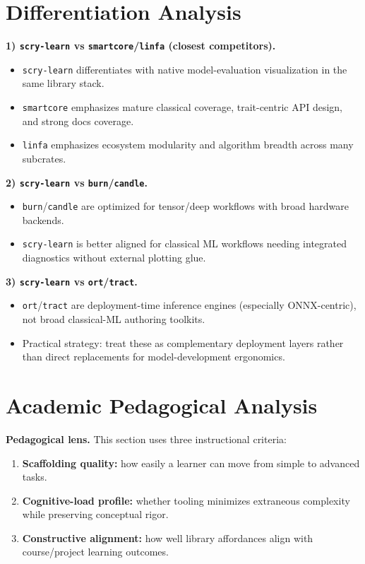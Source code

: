 \documentclass[11pt]{article}
\begin{document}
\section{Differentiation Analysis}
\textbf{1) \texttt{scry-learn} vs \texttt{smartcore}/\texttt{linfa} (closest competitors).}
\begin{itemize}[leftmargin=1.4em]
\item \texttt{scry-learn} differentiates with native model-evaluation visualization in the same library stack.
\item \texttt{smartcore} emphasizes mature classical coverage, trait-centric API design, and strong docs coverage.
\item \texttt{linfa} emphasizes ecosystem modularity and algorithm breadth across many subcrates.
\end{itemize}

\textbf{2) \texttt{scry-learn} vs \texttt{burn}/\texttt{candle}.}
\begin{itemize}[leftmargin=1.4em]
\item \texttt{burn}/\texttt{candle} are optimized for tensor/deep workflows with broad hardware backends.
\item \texttt{scry-learn} is better aligned for classical ML workflows needing integrated diagnostics without external plotting glue.
\end{itemize}

\textbf{3) \texttt{scry-learn} vs \texttt{ort}/\texttt{tract}.}
\begin{itemize}[leftmargin=1.4em]
\item \texttt{ort}/\texttt{tract} are deployment-time inference engines (especially ONNX-centric), not broad classical-ML authoring toolkits.
\item Practical strategy: treat these as complementary deployment layers rather than direct replacements for model-development ergonomics.
\end{itemize}

\section{Academic Pedagogical Analysis}
\textbf{Pedagogical lens.} This section uses three instructional criteria:
\begin{enumerate}[leftmargin=1.4em]
\item \textbf{Scaffolding quality:} how easily a learner can move from simple to advanced tasks.
\item \textbf{Cognitive-load profile:} whether tooling minimizes extraneous complexity while preserving conceptual rigor.
\item \textbf{Constructive alignment:} how well library affordances align with course/project learning outcomes.
\end{enumerate}
\end{document}

